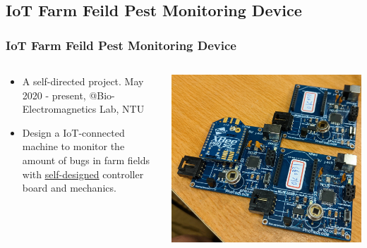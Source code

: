\documentclass[compress]{beamer}
\begin{document}
\subsection{IoT Farm Feild Pest Monitoring Device}
\begin{frame}
    \frametitle{IoT Farm Feild Pest Monitoring Device}
    \begin{columns}
        \begin{column}{0.5\linewidth}
            \begin{itemize}
                \item A self-directed project. May 2020 - present, @Bio-Electromagnetics Lab, NTU
                \item Design a IoT-connected machine to monitor the amount of bugs in farm fields with \href{https://bencer3283.github.io/experiences/Iot/}{\underline{self-designed}} controller board and mechanics.
            \end{itemize}
        \end{column}
        \begin{column}{0.5\linewidth}
            \includegraphics[width=\linewidth]{3pGto7b.jpg}
        \end{column}
    \end{columns}
\end{frame}
\end{document}
